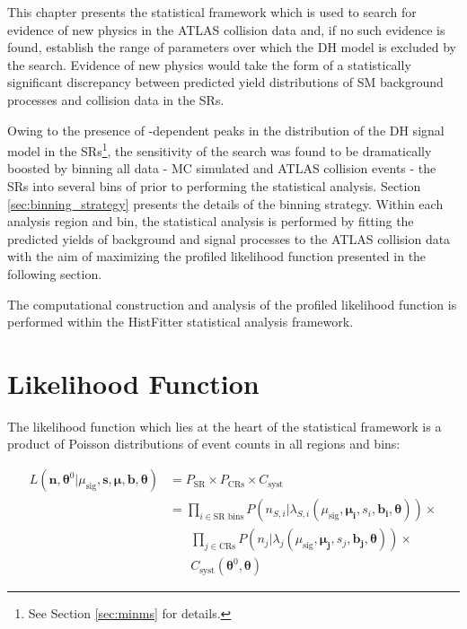 \label{chapter:stat}

This chapter presents the statistical framework which is used to search for evidence of new physics in the ATLAS collision data and, if no such evidence is found, establish the range of parameters over which the DH model is excluded by the search. Evidence of new physics would take the form of a statistically significant discrepancy between predicted yield distributions of SM background processes and collision data in the SRs. 

Owing to the presence of \ms-dependent peaks in the \minms distribution of the DH signal model in the SRs\footnote{See Section \ref{sec:minms} for details.}, the sensitivity of the search was found to be dramatically boosted by binning all data - MC simulated and ATLAS collision events - the SRs into several bins of \minms prior to performing the statistical analysis. Section \ref{sec:binning_strategy} presents the details of the binning strategy. Within each analysis region and bin, the statistical analysis is performed by fitting the predicted yields of background and signal processes to the ATLAS collision data with the aim of maximizing the profiled likelihood function presented in the following section. 

The computational construction and analysis of the profiled likelihood function is performed within the HistFitter \cite{Baak_2015} statistical analysis framework.

\section{Likelihood Function}
\label{sec:likelihood}

The likelihood function which lies at the heart of the statistical framework is a product of Poisson distributions of event counts in all regions and bins:

\begin{equation}
\label{eq:likelihood_func}
\begin{aligned}
L(\boldsymbol{n}, \boldsymbol{\theta}^0|\mu_\text{sig}, \boldsymbol{s}, \boldsymbol{\mu}, \boldsymbol{b}, \boldsymbol{\theta}) & = P_\text{SR} \times P_\text{CRs} \times C_\text{syst} \\
& = \prod_{i\in\text{SR bins}} P(n_{S,i}|\lambda_{S,i}(\mu_\text{sig}, \boldsymbol{\mu_i}, s_i, \boldsymbol{b_i}, \boldsymbol{\theta})) \times \\ 
&\phantom{xxx}\prod_{j \in \text{CRs}} P(n_j|\lambda_j(\mu_\text{sig}, \boldsymbol{\mu_j}, s_j, \boldsymbol{b_j}, \boldsymbol{\theta})) \times \\
&\phantom{xxx}C_\text{syst}(\boldsymbol{\theta}^0, \boldsymbol{\theta})
\end{aligned}
\end{equation}

